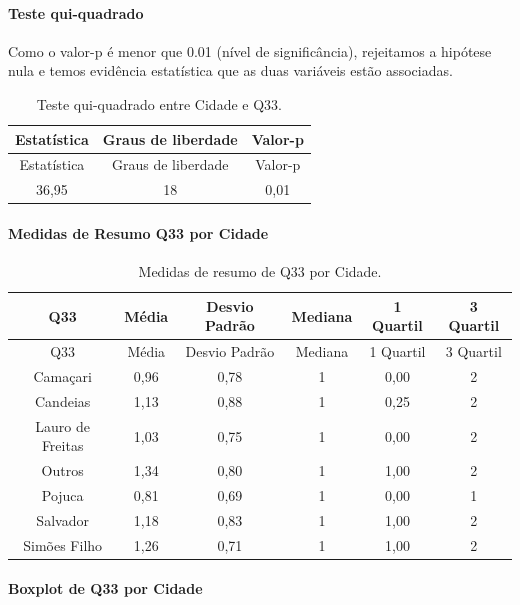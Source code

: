 \documentclass[]{article}
\let\oldparagraph\paragraph
\renewcommand{\paragraph}[1]{\oldparagraph{#1}\mbox{}}
\begin{document}
\hypertarget{teste-qui-quadrado-97}{%
\paragraph{Teste qui-quadrado}\label{teste-qui-quadrado-97}}

Como o valor-p é menor que 0.01 (nível de significância), rejeitamos a hipótese nula e temos evidência estatística que as duas variáveis estão associadas.

\begin{longtable}[]{@{}ccc@{}}
\caption{\label{tab:unnamed-chunk-1137}Teste qui-quadrado entre Cidade e Q33.}\tabularnewline
\toprule
Estatística & Graus de liberdade & Valor-p\tabularnewline
\midrule
\endfirsthead
\toprule
Estatística & Graus de liberdade & Valor-p\tabularnewline
\midrule
\endhead
36,95 & 18 & 0,01\tabularnewline
\bottomrule
\end{longtable}

\cleardoublepage

\hypertarget{medidas-de-resumo-q33-por-cidade}{%
\paragraph{Medidas de Resumo Q33 por Cidade}\label{medidas-de-resumo-q33-por-cidade}}

\begin{longtable}[]{@{}cccccc@{}}
\caption{\label{tab:unnamed-chunk-1138}Medidas de resumo de Q33 por Cidade.}\tabularnewline
\toprule
Q33 & Média & Desvio Padrão & Mediana & 1 Quartil & 3 Quartil\tabularnewline
\midrule
\endfirsthead
\toprule
Q33 & Média & Desvio Padrão & Mediana & 1 Quartil & 3 Quartil\tabularnewline
\midrule
\endhead
Camaçari & 0,96 & 0,78 & 1 & 0,00 & 2\tabularnewline
Candeias & 1,13 & 0,88 & 1 & 0,25 & 2\tabularnewline
Lauro de Freitas & 1,03 & 0,75 & 1 & 0,00 & 2\tabularnewline
Outros & 1,34 & 0,80 & 1 & 1,00 & 2\tabularnewline
Pojuca & 0,81 & 0,69 & 1 & 0,00 & 1\tabularnewline
Salvador & 1,18 & 0,83 & 1 & 1,00 & 2\tabularnewline
Simões Filho & 1,26 & 0,71 & 1 & 1,00 & 2\tabularnewline
\bottomrule
\end{longtable}

\hypertarget{boxplot-de-q33-por-cidade}{%
\paragraph{Boxplot de Q33 por Cidade}\label{boxplot-de-q33-por-cidade}}
\end{document}
